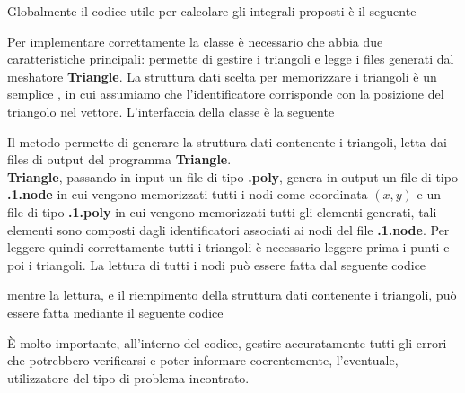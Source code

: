 \lstset{basicstyle=\scriptsize\sf}

\lstset{basicstyle=\sf}

Globalmente il codice utile per calcolare gli integrali proposti \`e il seguente

\lstset{basicstyle=\scriptsize\sf}

\lstset{basicstyle=\sf}

Per implementare correttamente la classe  \`e necessario che abbia due caratteristiche principali: permette di gestire i triangoli e legge i files generati dal meshatore \textbf{Triangle}. La struttura dati scelta per memorizzare i triangoli \`e un semplice , in cui assumiamo che l'identificatore corrisponde con la posizione del triangolo nel vettore. L'interfaccia della classe  \`e la seguente

\lstset{basicstyle=\scriptsize\sf}

\lstset{basicstyle=\sf}

Il metodo  permette di generare la struttura dati contenente i triangoli, letta dai files di output del programma \textbf{Triangle}.\\
\textbf{Triangle}, passando in input un file di tipo \textbf{.poly}, genera in output un file di tipo \textbf{.1.node} in cui vengono memorizzati tutti i nodi come coordinata $(x, y)$ e un file di tipo \textbf{.1.poly} in cui vengono memorizzati tutti gli elementi generati, tali elementi sono composti dagli identificatori associati ai nodi del file \textbf{.1.node}. Per leggere quindi correttamente tutti i triangoli \`e necessario leggere prima i punti e poi i triangoli. La lettura di tutti i nodi pu\`o essere fatta dal seguente codice

\lstset{basicstyle=\scriptsize\sf}

\lstset{basicstyle=\sf}

mentre la lettura, e il riempimento della struttura dati contenente i triangoli, pu\`o essere fatta mediante il seguente codice

\lstset{basicstyle=\scriptsize\sf}

\lstset{basicstyle=\sf}

\`E molto importante, all'interno del codice, gestire accuratamente tutti gli errori che potrebbero verificarsi e poter informare coerentemente, l'eventuale, utilizzatore del tipo di problema incontrato.\\

